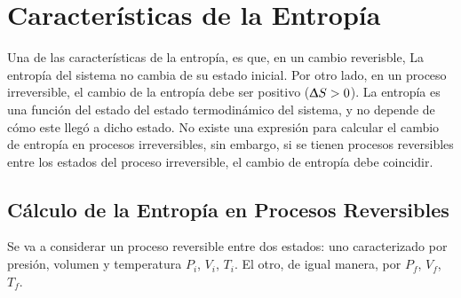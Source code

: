 \section{Características de la Entropía}

Una de las características de la entropía, es que, en un cambio
reverisble, La entropía del sistema no cambia de su estado
inicial. Por otro lado, en un proceso irreversible, el cambio de la
entropía debe ser positivo ($\Updelta S > 0$). La entropía es una
función del estado del estado termodinámico del sistema, y no depende
de cómo este llegó a dicho estado. No existe una expresión para
calcular el cambio de entropía en procesos irreversibles, sin embargo,
si se tienen procesos reversibles entre los estados del proceso
irreversible, el cambio de entropía debe coincidir.

\subsection{Cálculo de la Entropía en Procesos Reversibles}

Se va a considerar un proceso reversible entre dos estados: uno
caracterizado por presión, volumen y temperatura $P_i$, $V_i$, $T_i$.
El otro, de igual manera, por $P_f$, $V_f$, $T_f$.
\begin{center}
\end{center}

